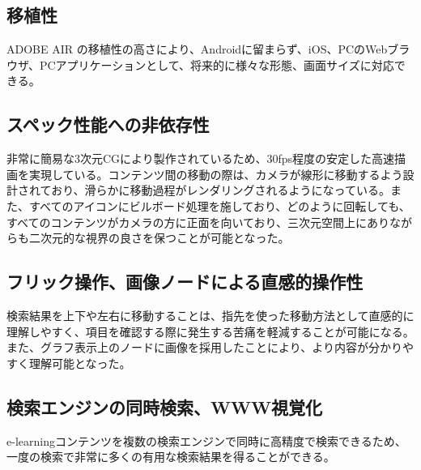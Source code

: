 \subsection{移植性}
ADOBE AIR の移植性の高さにより、Androidに留まらず、iOS、PCのWebブラウザ、PCアプリケーションとして、将来的に様々な形態、画面サイズに対応できる。

\subsection{スペック性能への非依存性}
非常に簡易な3次元CGにより製作されているため、30fps程度の安定した高速描画を実現している。コンテンツ間の移動の際は、カメラが線形に移動するよう設計されており、滑らかに移動過程がレンダリングされるようになっている。また、すべてのアイコンにビルボード処理を施しており、どのように回転しても、すべてのコンテンツがカメラの方に正面を向いており、三次元空間上にありながらも二次元的な視界の良さを保つことが可能となった。

\subsection{フリック操作、画像ノードによる直感的操作性}
検索結果を上下や左右に移動することは、指先を使った移動方法として直感的に理解しやすく、項目を確認する際に発生する苦痛を軽減することが可能になる。また、グラフ表示上のノードに画像を採用したことにより、より内容が分かりやすく理解可能となった。

\subsection{検索エンジンの同時検索、WWW視覚化}
e-learningコンテンツを複数の検索エンジンで同時に高精度で検索できるため、一度の検索で非常に多くの有用な検索結果を得ることができる。